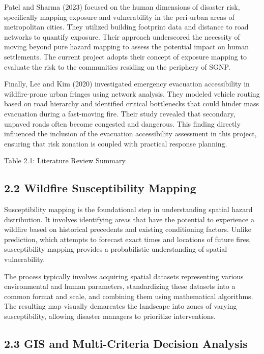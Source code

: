 \documentclass[12pt,a4paper]{article}
\begin{document}
Patel and Sharma (2023) focused on the human dimensions of disaster risk, specifically mapping exposure and vulnerability in the peri-urban areas of metropolitan cities. They utilized building footprint data and distance to road networks to quantify exposure. Their approach underscored the necessity of moving beyond pure hazard mapping to assess the potential impact on human settlements. The current project adopts their concept of exposure mapping to evaluate the risk to the communities residing on the periphery of SGNP.


Finally, Lee and Kim (2020) investigated emergency evacuation accessibility in wildfire-prone urban fringes using network analysis. They modeled vehicle routing based on road hierarchy and identified critical bottlenecks that could hinder mass evacuation during a fast-moving fire. Their study revealed that secondary, unpaved roads often become congested and dangerous. This finding directly influenced the inclusion of the evacuation accessibility assessment in this project, ensuring that risk zonation is coupled with practical response planning.


Table 2.1: Literature Review Summary



\subsection*{2.2 Wildfire Susceptibility Mapping}

Susceptibility mapping is the foundational step in understanding spatial hazard distribution. It involves identifying areas that have the potential to experience a wildfire based on historical precedents and existing conditioning factors. Unlike prediction, which attempts to forecast exact times and locations of future fires, susceptibility mapping provides a probabilistic understanding of spatial vulnerability.


The process typically involves acquiring spatial datasets representing various environmental and human parameters, standardizing these datasets into a common format and scale, and combining them using mathematical algorithms. The resulting map visually demarcates the landscape into zones of varying susceptibility, allowing disaster managers to prioritize interventions.



\subsection*{2.3 GIS and Multi-Criteria Decision Analysis}
\end{document}
